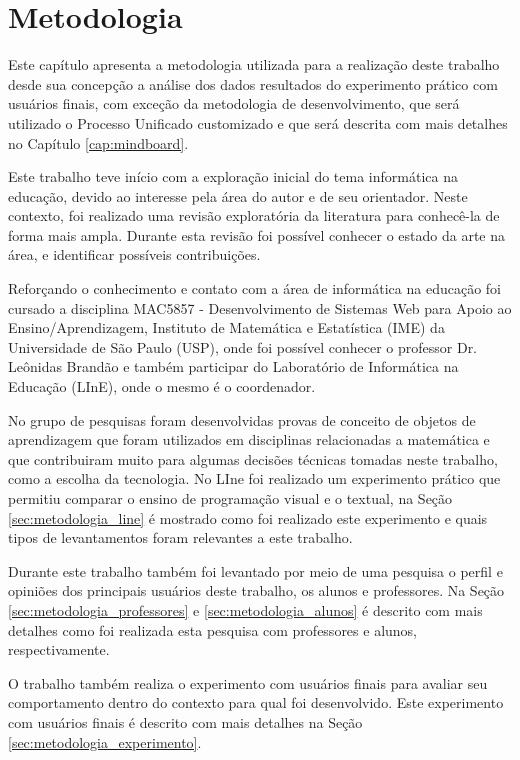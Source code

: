 \chapter{Metodologia}
\label{cap:metodologia}

Este capítulo apresenta a metodologia utilizada para a realização deste trabalho desde sua concepção a análise dos dados resultados do experimento prático com usuários finais, com exceção da  metodologia de desenvolvimento, que será utilizado o Processo Unificado customizado e que será descrita com mais detalhes no Capítulo \ref{cap:mindboard}. 

Este trabalho teve início com a exploração inicial do tema informática na educação, devido ao interesse pela área do autor e de seu orientador. Neste contexto, foi realizado uma revisão exploratória da literatura para conhecê-la de forma mais ampla. Durante esta revisão foi possível conhecer o estado da arte na área, e identificar possíveis contribuições.

Reforçando o conhecimento e contato com a área de informática na educação foi cursado a disciplina MAC5857 - Desenvolvimento de Sistemas Web para Apoio ao Ensino/Aprendizagem, Instituto de Matemática e Estatística (IME) da Universidade de São Paulo (USP), onde foi possível conhecer o professor Dr. Leônidas Brandão e também participar do Laboratório de Informática na Educação (LInE), onde o mesmo é o coordenador.

No grupo de pesquisas foram desenvolvidas provas de conceito de objetos de aprendizagem que foram utilizados em disciplinas relacionadas a matemática e que contribuiram muito para algumas decisões técnicas tomadas neste trabalho, como a escolha da tecnologia. No LIne foi realizado um experimento prático que permitiu comparar o ensino de programação visual e o textual, na Seção \ref{sec:metodologia_line} é mostrado como foi realizado este experimento e quais tipos de levantamentos foram relevantes a este trabalho.

Durante este trabalho também foi levantado por meio de uma pesquisa o perfil e opiniões dos principais usuários deste trabalho, os alunos e professores. Na Seção \ref{sec:metodologia_professores} e \ref{sec:metodologia_alunos} é descrito com mais detalhes como foi realizada esta pesquisa com professores e alunos, respectivamente.

O trabalho também realiza o experimento com usuários finais para avaliar seu comportamento dentro do contexto para qual foi desenvolvido. Este experimento com usuários finais é descrito com mais detalhes na Seção \ref{sec:metodologia_experimento}.

